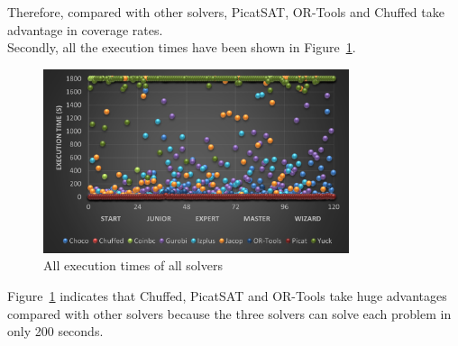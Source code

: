 Therefore, compared with other solvers, PicatSAT, OR-Tools and Chuffed take advantage in coverage rates.
\\Secondly, all the execution times have been shown in Figure~\ref{fig:execution times}.
\begin{figure}[H]
    \centering
    \includegraphics[width=0.8\textwidth]{figs/all_point_IQtwist.png}
    \caption{All execution times of all solvers}
    \label{fig:execution times}
\end{figure}
Figure~\ref{fig:execution times} indicates that Chuffed, PicatSAT and OR-Tools take huge advantages compared with other solvers because the three solvers can solve each problem in only 200 seconds.
